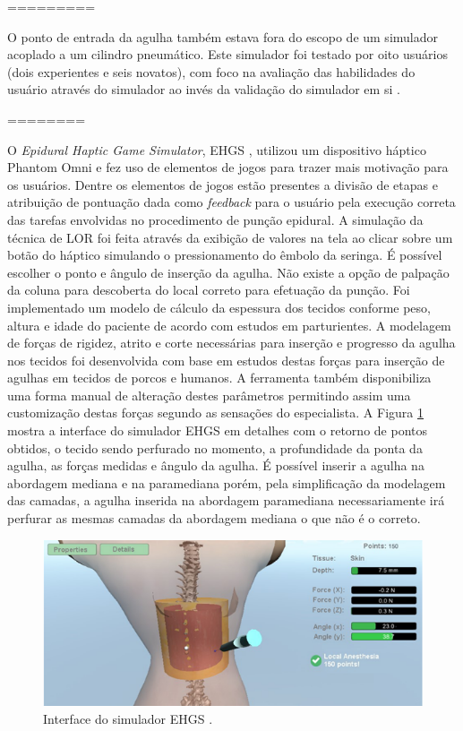 =========

O ponto de entrada da agulha também estava fora do escopo de um simulador acoplado a um cilindro pneumático. Este simulador foi testado por oito usuários (dois experientes e seis novatos), com foco na avaliação das habilidades do usuário através do simulador ao invés da validação do simulador em si \cite{Senac2019}. 

========

O \textit{Epidural Haptic Game Simulator}, EHGS \cite{Brazil2017}, utilizou um dispositivo háptico Phantom Omni e fez uso de elementos de jogos para trazer mais motivação para os usuários. Dentre os elementos de jogos estão presentes a divisão de etapas e atribuição de pontuação dada como \textit{feedback} para o usuário pela execução correta das tarefas envolvidas no procedimento de punção epidural. A simulação da técnica de LOR foi feita através da exibição de valores na tela ao clicar sobre um botão do háptico simulando o pressionamento do êmbolo da seringa. É possível escolher o ponto e ângulo de inserção da agulha. Não existe a opção de palpação da coluna para descoberta do local correto para efetuação da punção. Foi implementado um modelo de cálculo da espessura dos tecidos conforme peso, altura e idade do paciente de acordo com estudos em parturientes. A modelagem de forças de rigidez, atrito e corte necessárias para inserção e progresso da agulha nos tecidos foi desenvolvida com base em estudos destas forças para inserção de agulhas em tecidos de porcos e humanos. A ferramenta também disponibiliza uma forma manual de alteração destes parâmetros permitindo assim uma customização destas forças segundo as sensações do especialista. A Figura \ref{fig:brasilSimulator} mostra a interface do simulador EHGS em detalhes com o retorno de pontos obtidos, o tecido sendo perfurado no momento, a profundidade da ponta da agulha, as forças medidas e ângulo da agulha. É possível inserir a agulha na abordagem mediana e na paramediana porém, pela simplificação da modelagem das camadas, a agulha inserida na abordagem paramediana necessariamente irá perfurar as mesmas camadas da abordagem mediana o que não é o correto.  

\begin{figure}[ht!]
    \centering
    \includegraphics[width=0.8\linewidth]{capitulos/figuras/brasilSimulator.png} 
    \caption{Interface do simulador EHGS \cite{Brazil2017}.}
    \label{fig:brasilSimulator}
\end{figure}

